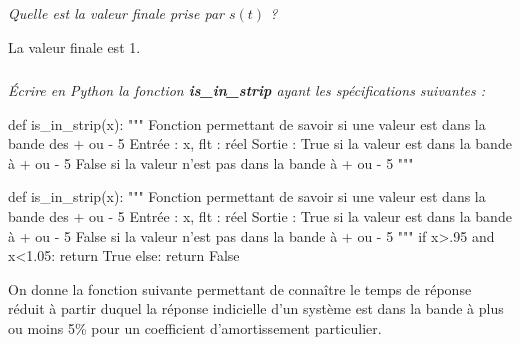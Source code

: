 \documentclass[10pt,fleqn]{article} %
\begin{document}
\subparagraph{}
\textit{Quelle est la valeur finale prise par $s(t)$ ?} 
\ifprof
\begin{corrige}
La valeur finale est 1. 
\end{corrige}
\else



\fi


\subparagraph{}
\textit{Écrire en Python la fonction \textsf{\textbf{is\_in\_strip}} ayant les spécifications suivantes : } 
\ifprof
\else

\begin{py}
\begin{python}
def is_in_strip(x):
    """
    Fonction permettant de savoir si une valeur est dans la bande des + ou - 5%
    Entrée : 
        x, flt : réel
    Sortie : 
        True si la valeur est dans la bande à + ou - 5%
        False si la valeur n'est pas dans la bande à + ou - 5%
    """
\end{python}
\end{py}
\fi

\ifprof
\begin{corrige}
\begin{py}
\begin{python}
def is_in_strip(x):
    """
    Fonction permettant de savoir si une valeur est dans la bande des + ou - 5%
    Entrée : 
        x, flt : réel
    Sortie : 
        True si la valeur est dans la bande à + ou - 5%
        False si la valeur n'est pas dans la bande à + ou - 5%
    """
    if x>.95 and x<1.05:
        return True
    else:
        return False
\end{python}
\end{py}
\end{corrige}
\else
%
%
\fi

\ifprof
\else
\vspace{1cm}

On donne la fonction suivante permettant de connaître le temps de réponse réduit à partir duquel la réponse indicielle d'un système est dans la bande à plus ou moins 5\% pour un coefficient d'amortissement particulier.
\end{document}
